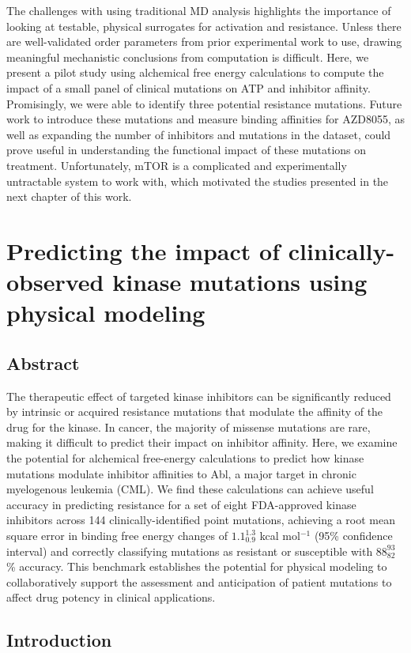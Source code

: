 \documentclass[phd,tocprelim]{cornell}
\begin{document}
The challenges with using traditional MD analysis highlights the importance of looking at testable, physical surrogates for activation and resistance. Unless there are well-validated order parameters from prior experimental work to use, drawing meaningful mechanistic conclusions from computation is difficult. Here, we present a pilot study using alchemical free energy calculations to compute the impact of a small panel of clinical mutations on ATP and inhibitor affinity. Promisingly, we were able to identify three potential resistance mutations. Future work to introduce these mutations and measure binding affinities for AZD8055, as well as expanding the number of inhibitors and mutations in the dataset, could prove useful in understanding the functional impact of these mutations on treatment. Unfortunately, mTOR is a complicated and experimentally untractable system to work with, which motivated the studies presented in the next chapter of this work. 

\chapter{Predicting the impact of clinically-observed kinase mutations using physical modeling}
\section{Abstract}
	The therapeutic effect of targeted kinase inhibitors can be significantly reduced by intrinsic or acquired resistance mutations that modulate the affinity of the drug for the kinase.
	In cancer, the majority of missense mutations are rare, making it difficult to predict their impact on inhibitor affinity. 
	Here, we examine the potential for alchemical free-energy calculations to predict how kinase mutations modulate inhibitor affinities to Abl, a major target in chronic myelogenous leukemia (CML).
	We find these calculations can achieve useful accuracy in predicting resistance for a set of eight FDA-approved kinase inhibitors across 144 clinically-identified point mutations, achieving a root mean square error in binding free energy changes of $1.1_{0.9}^{1.3}$ kcal mol$^{-1}$ (95\% confidence interval) and correctly classifying mutations as resistant or susceptible with $88_{82}^{93}$\% accuracy.
	This benchmark establishes the potential for physical modeling to collaboratively support the assessment and anticipation of patient mutations to affect drug potency in clinical applications.
	
\section{Introduction}
\end{document}
